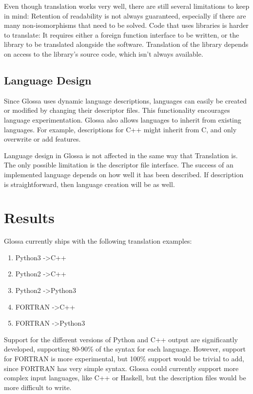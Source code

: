 \documentclass{article}
\begin{document}
Even though translation works very well, there are still several limitations to keep in mind:
Retention of readability is not always guaranteed, especially if there are many non-isomorphisms that need to be solved.
Code that uses libraries is harder to translate: 
It requires either a foreign function interface to be written, or the library to be translated alongside the software. 
Translation of the library depends on access to the library's source code, which isn't always available.

\subsection{Language Design}

Since Glossa uses dynamic language descriptions, languages can easily be created or modified by changing their descriptor files. 
This functionality encourages language experimentation.
Glossa also allows languages to inherit from existing languages. 
For example, descriptions for C++ might inherit from C, and only overwrite or add features.

Language design in Glossa is not affected in the same way that Translation is.
The only possible limitation is the descriptor file interface.
The success of an implemented language depends on how well it has been described.
If description is straightforward, then language creation will be as well.

\section{Results}

Glossa currently ships with the following translation examples:
\begin{enumerate}
    \item Python3 -\textgreater C++
    \item Python2 -\textgreater C++ 
    \item Python2 -\textgreater Python3
    \item FORTRAN -\textgreater C++ 
    \item FORTRAN -\textgreater Python3 
\end{enumerate}

Support for the different versions of Python and C++ output are significantly developed, supporting 80-90\% of the syntax for each language. 
However, support for FORTRAN is more experimental, but 100\% support would be trivial to add, since FORTRAN has very simple syntax.
Glossa could currently support more complex input languages, like C++ or Haskell, but the description files would be more difficult to write.
\end{document}
